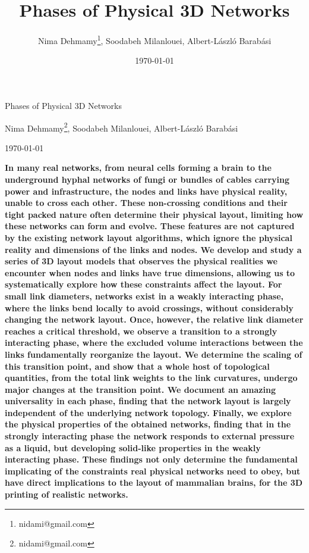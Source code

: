 \documentclass[nofootinbib,preprint,floatfix,titlepage,endfloats]{revtex4} %
\begin{document}
\title{Phases of Physical 3D Networks}
\author{Nima Dehmamy\thanks{nidami@gmail.com}, Soodabeh Milanlouei, Albert-L\'aszl\'o Barab\'asi}
\date{\today}
\centerline{\Huge Phases of Physical 3D Networks}
\medskip
\centerline{Nima Dehmamy\footnote{nidami@gmail.com}, Soodabeh Milanlouei, Albert-L\'aszl\'o Barab\'asi}
\centerline{\today}
\bigskip
{\bf 
In many real networks, from neural cells forming a brain to the underground hyphal networks of fungi 
or bundles of cables carrying power and infrastructure,
the nodes and links have physical reality, unable to cross each other. 
These non-crossing conditions and their tight packed nature often determine their physical layout, limiting how these networks can form and evolve. 
These features are not captured by the existing network layout algorithms, which ignore the physical reality and dimensions of the links and nodes. 
We develop and study a series of 3D layout models that observes the physical realities we encounter when nodes and links have true dimensions, allowing us to systematically explore how these constraints affect the layout. 
For small link diameters, networks exist in a weakly interacting phase, where the links bend locally to avoid crossings, without considerably changing the network layout. Once, however, the relative link diameter reaches a critical threshold, we observe a transition to a strongly interacting phase, where the excluded volume interactions between the links fundamentally reorganize the layout. 
We determine the scaling of this transition point, and show that a whole host of topological quantities, from the total link weights to the link curvatures, undergo major changes at the transition point. 
We document an amazing universality in each phase, finding that the network layout is largely independent of the underlying network topology. 
Finally, we explore the physical properties of the obtained networks, finding that in the strongly interacting phase the network responds to external pressure as a liquid, but developing solid-like properties in the weakly interacting phase. 
These findings not only determine the fundamental implicating of the constraints real physical networks need to obey, but have direct implications to the layout of mammalian brains, for the 3D printing of realistic networks.
}
\end{document}
